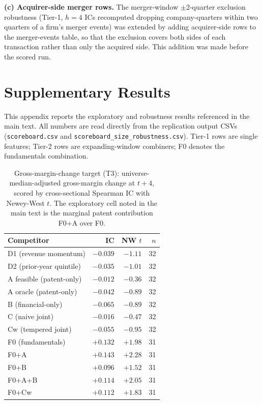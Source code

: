 \documentclass[11pt]{article}
\begin{document}
\textbf{(c) Acquirer-side merger rows.} The merger-window $\pm$2-quarter exclusion robustness (Tier-1, $h=4$ ICs recomputed dropping company-quarters within two quarters of a firm's merger events) was extended by adding acquirer-side rows to the merger-events table, so that the exclusion covers both sides of each transaction rather than only the acquired side. This addition was made before the scored run.

\section{Supplementary Results}

This appendix reports the exploratory and robustness results referenced in the main text. All numbers are read directly from the replication output CSVs (\texttt{scoreboard.csv} and \texttt{scoreboard\_\allowbreak size\_\allowbreak robustness.\allowbreak csv}). Tier-1 rows are single features; Tier-2 rows are expanding-window combiners; F0 denotes the fundamentals combination.

\begin{table}[htbp]
  \centering
  \caption{Gross-margin-change target (T3): universe-median-adjusted gross-margin change at $t+4$, scored by cross-sectional Spearman IC with Newey-West $t$. The exploratory cell noted in the main text is the marginal patent contribution F0+A over F0.}
  \label{tab:t3}
  \begin{tabular}{lrrr}
    \toprule
    Competitor & IC & NW $t$ & $n$ \\
    \midrule
    D1 (revenue momentum) & $-0.039$ & $-1.11$ & 32 \\
    D2 (prior-year quintile) & $-0.035$ & $-1.01$ & 32 \\
    A feasible (patent-only) & $-0.012$ & $-0.36$ & 32 \\
    A oracle (patent-only) & $-0.042$ & $-0.89$ & 32 \\
    B (financial-only) & $-0.065$ & $-0.89$ & 32 \\
    C (naive joint) & $-0.016$ & $-0.47$ & 32 \\
    Cw (tempered joint) & $-0.055$ & $-0.95$ & 32 \\
    \midrule
    F0 (fundamentals) & $+0.132$ & $+1.98$ & 31 \\
    F0+A & $+0.143$ & $+2.28$ & 31 \\
    F0+B & $+0.096$ & $+1.52$ & 31 \\
    F0+A+B & $+0.114$ & $+2.05$ & 31 \\
    F0+Cw & $+0.112$ & $+1.83$ & 31 \\
    \bottomrule
  \end{tabular}
\end{table}
\end{document}
